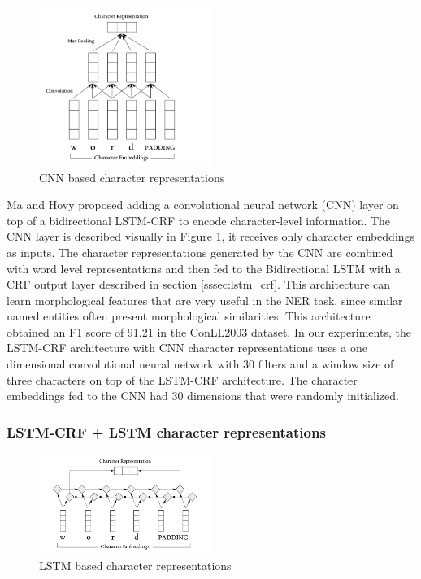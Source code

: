 \documentclass[sigconf]{acmart}
\begin{document}
\begin{figure}
  \centering
	  \includegraphics[width=0.5\textwidth]{pics/cnn}
  \caption{CNN based character representations}
  \label{fig:cnn}
\end{figure}

Ma and Hovy \cite{Ma2016} proposed adding a convolutional neural network (CNN) layer 
on top of a bidirectional LSTM-CRF to encode character-level information. The CNN
layer is described visually in Figure \ref{fig:cnn}, it receives
only character embeddings as inputs. The character representations generated by the CNN 
are combined with word level representations and then fed to the Bidirectional LSTM with
a CRF output layer described in section \ref{sssec:lstm_crf}.
This architecture can learn morphological features that are very
useful in the NER task, since similar named entities often present morphological similarities. 
This architecture obtained an F1 score of 91.21 in the ConLL2003 dataset. In our experiments, 
the LSTM-CRF architecture with CNN character representations uses a one dimensional convolutional 
neural network with 30 filters and a window size of three characters on top of the LSTM-CRF architecture.
The character embeddings fed to the CNN had 30 dimensions that were randomly initialized.

\subsubsection{LSTM-CRF + LSTM character representations}

\begin{figure}
  \centering
  \includegraphics[width=0.5\textwidth]{pics/lstm_char_representations}
  \caption{LSTM based character representations}
  \label{fig:lstm_char}
\end{figure}
\end{document}
